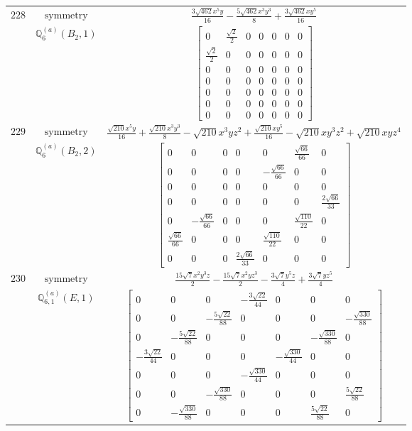 \documentclass[fleqn,8pt,landscape]{jsarticle}
\begin{document}
\begin{longtable}{ccc}
$ 228 $ & $ \text{symmetry} $ & $ \frac{3 \sqrt{462} x^{5} y}{16} - \frac{5 \sqrt{462} x^{3} y^{3}}{8} + \frac{3 \sqrt{462} x y^{5}}{16} $ \\
$  $ & $ \mathbb{Q}_{6}^{(a)}(B_{2},1) $ & $ \begin{bmatrix} 0 & \frac{\sqrt{2}}{2} & 0 & 0 & 0 & 0 & 0 \\ \frac{\sqrt{2}}{2} & 0 & 0 & 0 & 0 & 0 & 0 \\ 0 & 0 & 0 & 0 & 0 & 0 & 0 \\ 0 & 0 & 0 & 0 & 0 & 0 & 0 \\ 0 & 0 & 0 & 0 & 0 & 0 & 0 \\ 0 & 0 & 0 & 0 & 0 & 0 & 0 \\ 0 & 0 & 0 & 0 & 0 & 0 & 0 \end{bmatrix} $ \\ \hline
$ 229 $ & $ \text{symmetry} $ & $ \frac{\sqrt{210} x^{5} y}{16} + \frac{\sqrt{210} x^{3} y^{3}}{8} - \sqrt{210} x^{3} y z^{2} + \frac{\sqrt{210} x y^{5}}{16} - \sqrt{210} x y^{3} z^{2} + \sqrt{210} x y z^{4} $ \\
$  $ & $ \mathbb{Q}_{6}^{(a)}(B_{2},2) $ & $ \begin{bmatrix} 0 & 0 & 0 & 0 & 0 & \frac{\sqrt{66}}{66} & 0 \\ 0 & 0 & 0 & 0 & - \frac{\sqrt{66}}{66} & 0 & 0 \\ 0 & 0 & 0 & 0 & 0 & 0 & 0 \\ 0 & 0 & 0 & 0 & 0 & 0 & \frac{2 \sqrt{66}}{33} \\ 0 & - \frac{\sqrt{66}}{66} & 0 & 0 & 0 & \frac{\sqrt{110}}{22} & 0 \\ \frac{\sqrt{66}}{66} & 0 & 0 & 0 & \frac{\sqrt{110}}{22} & 0 & 0 \\ 0 & 0 & 0 & \frac{2 \sqrt{66}}{33} & 0 & 0 & 0 \end{bmatrix} $ \\ \hline
$ 230 $ & $ \text{symmetry} $ & $ \frac{15 \sqrt{7} x^{2} y^{3} z}{2} - \frac{15 \sqrt{7} x^{2} y z^{3}}{2} - \frac{3 \sqrt{7} y^{5} z}{4} + \frac{3 \sqrt{7} y z^{5}}{4} $ \\
$  $ & $ \mathbb{Q}_{6,1}^{(a)}(E,1) $ & $ \begin{bmatrix} 0 & 0 & 0 & - \frac{3 \sqrt{22}}{44} & 0 & 0 & 0 \\ 0 & 0 & - \frac{5 \sqrt{22}}{88} & 0 & 0 & 0 & - \frac{\sqrt{330}}{88} \\ 0 & - \frac{5 \sqrt{22}}{88} & 0 & 0 & 0 & - \frac{\sqrt{330}}{88} & 0 \\ - \frac{3 \sqrt{22}}{44} & 0 & 0 & 0 & - \frac{\sqrt{330}}{44} & 0 & 0 \\ 0 & 0 & 0 & - \frac{\sqrt{330}}{44} & 0 & 0 & 0 \\ 0 & 0 & - \frac{\sqrt{330}}{88} & 0 & 0 & 0 & \frac{5 \sqrt{22}}{88} \\ 0 & - \frac{\sqrt{330}}{88} & 0 & 0 & 0 & \frac{5 \sqrt{22}}{88} & 0 \end{bmatrix} $ \\ \hline

\end{longtable}
\end{document}
